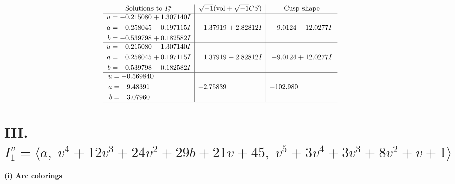 \documentclass[1p]{elsarticle_modified}
\theoremstyle{definition}
\newcommand{\I}{\sqrt{-1}}
\begin{document}
$$\begin{array}{c|c|c}  
\text{Solutions to }I^u_{2}& \I (\text{vol} + \sqrt{-1}CS) & \text{Cusp shape}\\
 \hline 
\begin{aligned}
u &= -0.215080 + 1.307140 I \\
a &= \phantom{-}0.258045 - 0.197115 I \\
b &= -0.539798 + 0.182582 I\end{aligned}
 & \phantom{-}1.37919 + 2.82812 I & -9.0124 - 12.0277 I \\ \hline\begin{aligned}
u &= -0.215080 - 1.307140 I \\
a &= \phantom{-}0.258045 + 0.197115 I \\
b &= -0.539798 - 0.182582 I\end{aligned}
 & \phantom{-}1.37919 - 2.82812 I & -9.0124 + 12.0277 I \\ \hline\begin{aligned}
u &= -0.569840\phantom{ +0.000000I} \\
a &= \phantom{-}9.48391\phantom{ +0.000000I} \\
b &= \phantom{-}3.07960\phantom{ +0.000000I}\end{aligned}
 & -2.75839\phantom{ +0.000000I} & -102.980\phantom{ +0.000000I}\\
 \hline 
 \end{array}$$\newpage\newpage\renewcommand{\arraystretch}{1}
\centering \section*{III. $I^v_{1}= \langle a,\;v^4+12 v^3+24 v^2+29 b+21 v+45,\;v^5+3 v^4+3 v^3+8 v^2+v+1 \rangle$}
\flushleft \textbf{(i) Arc colorings}\\
\end{document}
